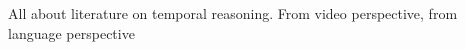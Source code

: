 All about literature on temporal reasoning. From video perspective, from
language perspective

\cite{allen1983interval}
\cite{bruce1972temporalqa}
\cite{zhou2021tracie}

%
%
%
%
